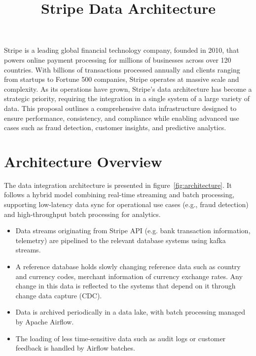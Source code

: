 \documentclass[11pt,a4paper,computermodern]{article}
\title{Stripe Data Architecture}
\date{}
\begin{document}
\maketitle

\vspace{-10mm}

Stripe is a leading global financial technology company, founded in 2010, that powers online payment processing for millions of businesses across over 120 countries. With billions of transactions processed annually and clients ranging from startups to Fortune 500 companies, Stripe operates at massive scale and complexity. As its operations have grown, Stripe's data architecture has become a strategic priority, requiring the integration in a single system of a large variety of data. This proposal outlines a comprehensive data infrastructure designed to ensure performance, consistency, and compliance while enabling advanced use cases such as fraud detection, customer insights, and predictive analytics.


\section*{Architecture Overview}

The data integration architecture is presented in figure~\ref{fig:architecture}. It follows a hybrid model combining real-time streaming and batch processing, supporting low-latency data sync for operational use cases (e.g., fraud detection) and high-throughput batch processing for analytics.
\begin{itemize}[itemsep=5pt, parsep=0pt]
	\item Data streams originating from Stripe API (e.g. bank transaction information, telemetry) are pipelined to the relevant database systems using kafka streams.
	\item A reference database holds slowly changing reference data such as country and currency codes, merchant information of currency exchange rates. Any change in this data is reflected to the systems that depend on it through change data capture (CDC).
	\item Data is archived periodically in a data lake, with batch processing managed by Apache Airflow.
	\item The loading of less time-sensitive data such as audit logs or customer feedback is handled by Airflow batches.
\end{itemize}
\end{document}
